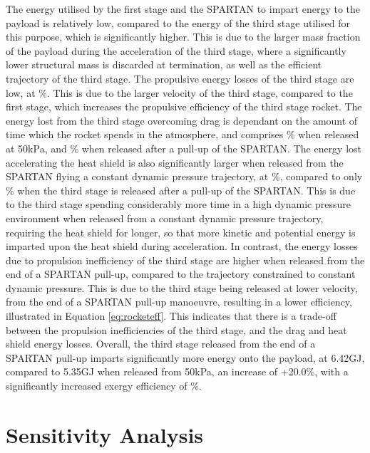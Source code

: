The energy utilised by the first stage and the SPARTAN to impart energy to the payload is relatively low, compared to the energy of the third stage utilised for this purpose, which is significantly higher. This is due to the larger mass fraction of the payload during the acceleration of the third stage, where a significantly lower structural mass is discarded at termination, as well as the efficient trajectory of the third stage. 
The propulsive energy losses of the third stage are low, at \PlossthreeCombinedStandardNoReturn \%. This is due to the larger velocity of the third stage, compared to the first stage, which increases the propulsive efficiency of the third stage rocket. 
The energy lost from the third stage overcoming drag is dependant on the amount of time which the rocket spends in the atmosphere, and comprises \WDthreeConstqNoReturn \% when released at 50kPa, and \WDthreeStandardNoReturn \% when released after a pull-up of the SPARTAN.
The energy lost accelerating the heat shield is also significantly larger when released from the SPARTAN flying a constant dynamic pressure trajectory, at \WHSthreeConstqNoReturn \%, compared to only \WHSthreeStandardNoReturn \% when the third stage is released after a pull-up of the SPARTAN. This is due to the third stage spending considerably more time in a high dynamic pressure environment when released from a constant dynamic pressure trajectory, requiring the heat shield for longer, so that more kinetic and potential energy is imparted upon the heat shield during acceleration. In contrast, the energy losses due to propulsion inefficiency of the third stage are higher when released from the end of a SPARTAN pull-up, compared to the trajectory constrained to constant dynamic pressure. This is due to the third stage being released at lower velocity, from the end of a SPARTAN pull-up manoeuvre, resulting in a lower efficiency, illustrated in Equation \ref{eq:rocketeff}. This indicates that there is a trade-off between the propulsion inefficiencies of the third stage, and the drag and heat shield energy losses. Overall, the third stage released from the end of a SPARTAN pull-up imparts significantly more energy onto the payload, at 6.42GJ, compared to 5.35GJ when released from 50kPa, an increase of +20.0\%, with a significantly increased exergy efficiency of \thirddExergyEffStandardNoReturn \%.   

\section{Sensitivity Analysis}\label{sec:sensitivityNoReturn}


